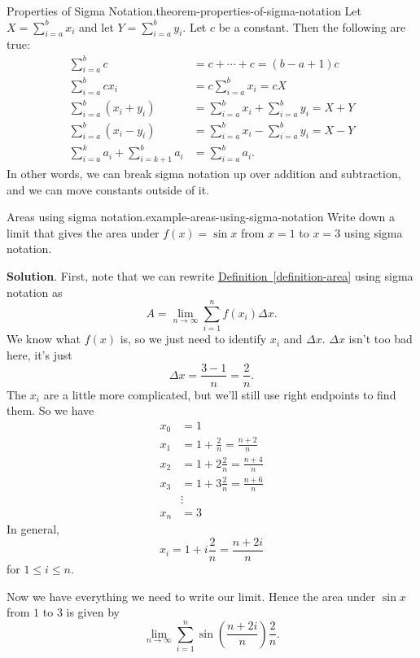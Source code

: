 \documentclass[10pt,]{book}
\numberwithin{equation}{section}
\begin{document}
\begin{theorem}{Properties of Sigma Notation.}{}{theorem-properties-of-sigma-notation}%
\hypertarget{p-416}{}%
Let \(X = \sum_{i=a}^{b}x_{i}\) and let \(Y = \sum_{i=a}^{b}y_{i}\). Let \(c\) be a constant. Then the following are true:%
\begin{align*}
\sum_{i=a}^{b}c & = c+\cdots+c = (b-a+1)c \\
\sum_{i=a}^{b}cx_{i} & = c\sum_{i=a}^{b}x_{i} = cX \\
\sum_{i=a}^{b}(x_{i}+y_{i}) & = \sum_{i=a}^{b}x_{i} + \sum_{i=a}^{b}y_{i} = X + Y \\
\sum_{i=a}^{b}(x_{i} - y_{i}) & = \sum_{i=a}^{b}x_{i} - \sum_{i=a}^{b}y_{i} = X - Y \\
\sum_{i=a}^{k}a_{i} + \sum_{i=k+1}^{b}a_{i} & = \sum_{i=a}^{b}a_{i}. 
\end{align*}
In other words, we can break sigma notation up over addition and subtraction, and we can move constants outside of it.%
\end{theorem}
\begin{example}{Areas using sigma notation.}{example-areas-using-sigma-notation}%
\hypertarget{p-417}{}%
Write down a limit that gives the area under \(f(x) = \sin x\) from \(x=1\) to \(x = 3\) using sigma notation.%
\par\smallskip%
\noindent\textbf{Solution}.\hypertarget{solution-92}{}\quad%
\hypertarget{p-418}{}%
First, note that we can rewrite \hyperref[definition-area]{Definition~\ref{definition-area}} using sigma notation as%
\begin{equation*}
A = \lim_{n\to\infty}\sum_{i=1}^{n}f(x_{i})\Delta x.
\end{equation*}
We know what \(f(x)\) is, so we just need to identify \(x_{i}\) and \(\Delta x\). \(\Delta x\) isn't too bad here, it's just%
\begin{equation*}
\Delta x = \frac{3-1}{n} = \frac{2}{n}.
\end{equation*}
The \(x_{i}\) are a little more complicated, but we'll still use right endpoints to find them. So we have%
\begin{align*}
x_{0} & = 1 \\
x_{1} & = 1 + \frac{2}{n} = \frac{n+2}{n} \\
x_{2} & = 1 + 2\frac{2}{n} = \frac{n+4}{n} \\
x_{3} & = 1 + 3\frac{2}{n} = \frac{n+6}{n} \\
& \vdots \\
x_{n} & = 3 
\end{align*}
In general,%
\begin{equation*}
x_{i} = 1 + i\frac{2}{n} = \frac{n+2i}{n}
\end{equation*}
for \(1\leq i\leq n\).%
\par
\hypertarget{p-419}{}%
Now we have everything we need to write our limit. Hence the area under \(\sin x\) from \(1\) to \(3\) is given by%
\begin{equation*}
\lim_{n\to\infty}\sum_{i=1}^{n}\sin\left(\frac{n+2i}{n}\right)\frac{2}{n}.
\end{equation*}
%
\end{example}
\end{document}
